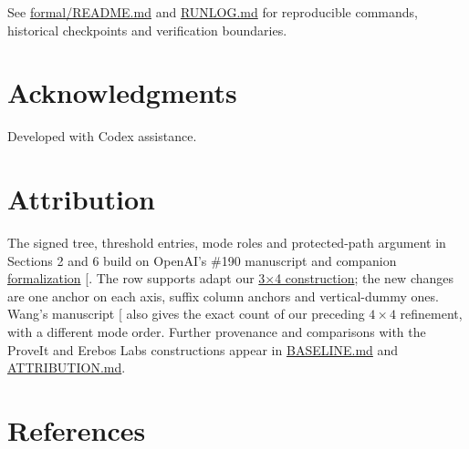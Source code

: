 \documentclass[11pt,letterpaper]{article}
\begin{document}
See
\href{https://github.com/shea256/ordered-binary-matrix-removal/blob/master/formal/README.md}{formal/README.md}
and
\href{https://github.com/shea256/ordered-binary-matrix-removal/blob/master/RUNLOG.md}{RUNLOG.md}
for reproducible commands, historical checkpoints and verification
boundaries.

\section*{Acknowledgments}\label{acknowledgments}

Developed with Codex assistance.

\section*{Attribution}\label{attribution}

The signed tree, threshold entries, mode roles and protected-path
argument in Sections 2 and 6 build on OpenAI's \#190 manuscript and
companion
\href{https://github.com/openai/math/blob/fd4aeeb2ee4fc729c18d98444fed42fd0529eeeb/lean/docs/190.md}{formalization}
{[}\citeproc{ref-openai2026}{4}{]}. The row supports adapt our
\href{https://github.com/shea256/ordered-binary-matrix-removal/blob/master/proofs/three-by-four.md}{3×4
construction}; the new changes are one anchor on each axis, suffix
column anchors and vertical-dummy ones. Wang's manuscript
{[}\citeproc{ref-wang2026}{7}{]} also gives the exact count of our
preceding \(4\times 4\) refinement, with a different mode order. Further
provenance and comparisons with the ProveIt and Erebos Labs
constructions appear in
\href{https://github.com/shea256/ordered-binary-matrix-removal/blob/master/BASELINE.md}{BASELINE.md}
and
\href{https://github.com/shea256/ordered-binary-matrix-removal/blob/master/ATTRIBUTION.md}{ATTRIBUTION.md}.

\section*{References}\label{references}
\end{document}
